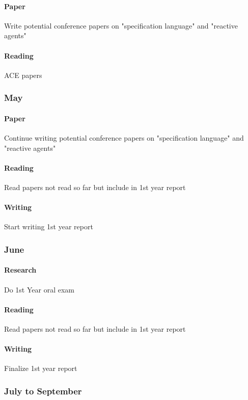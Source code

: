 \paragraph{Paper} Write potential conference papers on "specification language" and "reactive agents"
	
\paragraph{Reading} ACE papers

\subsubsection{May}
\paragraph{Paper} Continue writing potential conference papers on "specification language" and "reactive agents"

\paragraph{Reading} Read papers not read so far but include in 1st year report
	
\paragraph{Writing} Start writing 1st year report

\subsubsection{June}
\paragraph{Research} Do 1st Year oral exam

\paragraph{Reading} Read papers  not read so far but include in 1st year report

\paragraph{Writing} Finalize 1st year report

\subsubsection{July to September}
